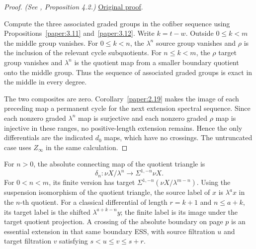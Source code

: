 \begin{proof}
\textit{(See \cite{LWX126}, Proposition 4.2.)} \href{paper/main.tex.html#L1030}{Original proof}.

Compute the three associated graded groups in the cofiber sequence using Propositions~\ref{paper:3.11} and~\ref{paper:3.12}. Write $k=t-w$. Outside $0\le k<m$ the middle group vanishes. For $0\le k<n$, the $\lambda^n$ source group vanishes and $\rho$ is the inclusion of the relevant cycle subquotients. For $n\le k<m$, the $\rho$ target group vanishes and $\lambda^n$ is the quotient map from a smaller boundary quotient onto the middle group. Thus the sequence of associated graded groups is exact in the middle in every degree.

The two composites are zero. Corollary~\ref{paper:2.19} makes the image of each preceding map a permanent cycle for the next extension spectral sequence. Since each nonzero graded $\lambda^n$ map is surjective and each nonzero graded $\rho$ map is injective in these ranges, no positive-length extension remains. Hence the only differentials are the indicated $d_0$ maps, which have no crossings. The untruncated case uses $Z_\infty$ in the same calculation.
\end{proof}

For $n>0$, the absolute connecting map of the quotient triangle is
\[\delta_n:\nu X/\lambda^n\longrightarrow\Sigma^{1,-n}\nu X.\]
For $0<n<m$, its finite version has target $\Sigma^{1,-n}(\nu X/\lambda^{m-n})$. Using the suspension isomorphism of the quotient triangle, the source label of $x$ is $\lambda^a x$ in the $n$-th quotient. For a classical differential of length $r=k+1$ and $n\leq a+k$, its target label is the shifted $\lambda^{a+k-n}y$; the finite label is its image under the target quotient projection. A crossing of the absolute boundary on page $p$ is an essential extension in that same boundary ESS, with source filtration $u$ and target filtration $v$ satisfying $s<u\leq v\leq s+r$.

